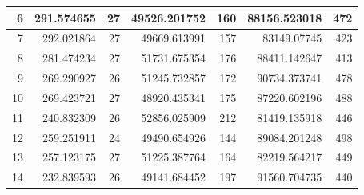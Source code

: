 \begin{table}
\begin{adjustwidth}{}{}
{{\begin{tabular}{|r|r|r|r|r|r|r|}
\hline
6                                          & 291.574655                   & 27                                    & 49526.201752                   & 160                                   & 88156.523018                 & 472                                    \\ 
\hline
7                                          & 292.021864                   & 27                                    & 49669.613991                   & 157                                   & 83149.07745                  & 423                                    \\ 
\hline
8                                          & 281.474234                   & 27                                    & 51731.675354                   & 176                                   & 88411.142647                 & 413                                    \\ 
\hline
9                                          & 269.290927                   & 26                                    & 51245.732857                   & 172                                   & 90734.373741                 & 478                                    \\ 
\hline
10                                         & 269.423721                   & 27                                    & 48920.435341                   & 175                                   & 87220.602196                 & 488                                    \\ 
\hline
11                                         & 240.832309                   & 26                                    & 52856.025909                   & 212                                   & 81419.135918                 & 446                                    \\ 
\hline
12                                         & 259.251911                   & 24                                    & 49490.654926                   & 144                                   & 89084.201248                 & 498                                    \\ 
\hline
13                                         & 257.123175                   & 27                                    & 51225.387764                   & 164                                   & 82219.564217                 & 449                                    \\ 
\hline
14                                         & 232.839593                   & 26                                    & 49141.684452                   & 197                                   & 91560.704735                 & 440                                    \\ 

\end{tabular}}}
\end{adjustwidth}
\end{table}
